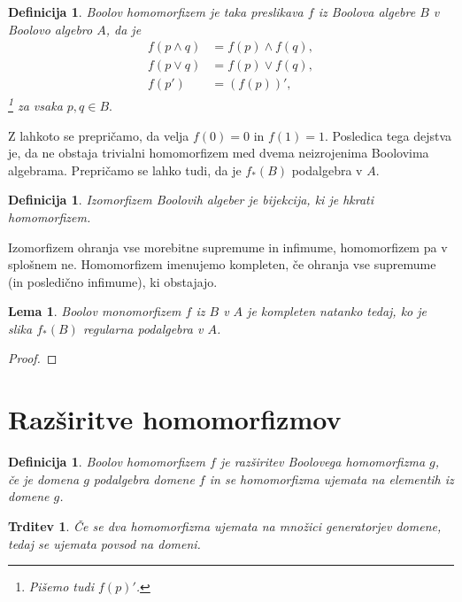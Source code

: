 \documentclass{amsart}
\newtheorem{lema}[izrek]{Lema}
\newtheorem{trditev}[izrek]{Trditev}
\newtheorem{definicija}[izrek]{Definicija}
\begin{document}
\begin{definicija}
    Boolov homomorfizem je taka preslikava $f$ iz Boolova algebre $B$ v 
    Boolovo algebro $A$, da je 
    \begin{align*}
        f(p \wedge q) &= f(p) \wedge f(q),\\
        f(p \vee q) &= f(p) \vee f(q),\\
        f(p') &= (f(p))',
    \end{align*}\footnote{Pišemo tudi \(f(p)'\).}
    za vsaka \(p, q \in B.\)
\end{definicija}

Z lahkoto se prepričamo, da velja \(f(0) = 0\) in \(f(1) = 1\). Posledica tega dejstva je, da ne obstaja trivialni homomorfizem med dvema
neizrojenima Boolovima algebrama. Prepričamo se lahko tudi, da je \(f_{*}(B)\) podalgebra v \(A\).

\begin{definicija}
    Izomorfizem Boolovih algeber je bijekcija, ki je hkrati homomorfizem.
\end{definicija}

Izomorfizem ohranja vse morebitne supremume in infimume, homomorfizem pa 
v splošnem ne. Homomorfizem imenujemo kompleten, če ohranja vse supremume (in posledično infimume), ki obstajajo.

\begin{lema}
    Boolov monomorfizem $f$ iz $B$ v $A$ je kompleten natanko tedaj, ko 
    je slika \(f_{*}(B)\) regularna podalgebra v $A$.
\end{lema}

\begin{proof}
    
\end{proof}

\section{Razširitve homomorfizmov}

\begin{definicija}
    Boolov homomorfizem $f$ je razširitev Boolovega homomorfizma $g$, če je 
    domena $g$ podalgebra domene $f$ in se homomorfizma ujemata na elementih iz domene $g$.
\end{definicija}


\begin{trditev}
    Če se dva homomorfizma ujemata na množici generatorjev domene, tedaj se ujemata povsod na domeni.
\end{trditev}
\end{document}
